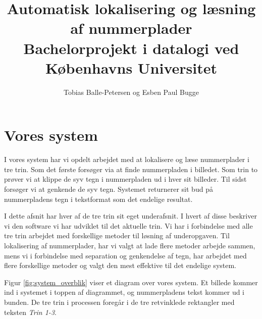 \documentclass[11pt,a4paper,final]{article}
\author{Tobias Balle-Petersen og Esben Paul Bugge}
\title{Automatisk lokalisering og læsning af nummerplader\\\large{Bachelorprojekt i datalogi ved Københavns Universitet}}
\begin{document}
\maketitle
\newpage
\tableofcontents
\newpage



\section{Vores system}
I vores system har vi opdelt arbejdet med at lokalisere og læse nummerplader i tre trin. Som det første forsøger via at finde nummerpladen i billedet. Som trin to prøver vi at klippe de syv tegn i nummerpladen ud i hver sit billeder. Til sidst forsøger vi at genkende de syv tegn. Systemet returnerer sit bud på nummerpladens tegn i tekstformat som det endelige resultat.

I dette afsnit har hver af de tre trin sit eget underafsnit. I hvert af disse beskriver vi den software vi har udviklet til det aktuelle trin. Vi har i forbindelse med alle tre trin arbejdet med forskellige metoder til løsning af underopgaven. Til lokalisering af nummerplader, har vi valgt at lade flere metoder arbejde sammen, mens vi i forbindelse med separation og genkendelse af tegn, har arbejdet med flere forskellige metoder og valgt den mest effektive til det endelige system.

 Figur \ref{fig:system_overblik} viser et diagram over vores system. Et billede kommer ind i systemet i toppen af diagrammet, og nummerpladens tekst kommer ud i bunden. De tre trin i processen foregår i de tre retvinklede rektangler med teksten \textit{Trin 1-3}. 
\end{document}
